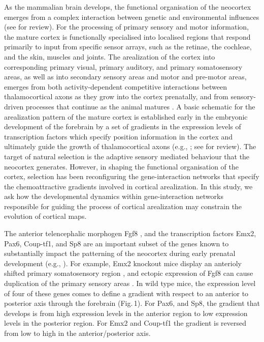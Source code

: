 \documentclass[10pt,letterpaper]{article}
\begin{document}
As the mammalian brain develops, the functional organisation of the neocortex emerges from a complex interaction between genetic and environmental influences (see \cite{Krubitzer2018} for review). For the processing of primary sensory and motor information, the mature cortex is functionally specialised into localised regions that respond primarily to input from specific sensor arrays, such as the retinae, the cochleae, and the skin, muscles and joints. The arealization of the cortex into corresponding primary visual, primary auditory, and primary somatosensory areas, as well as into secondary sensory areas and motor and pre-motor areas, emerges from both activity-dependent competitive interactions between thalamocortical axons as they grow into the cortex prenatally, and from sensory-driven processes that continue as the animal matures \cite{REFS}. A basic schematic for the arealization pattern of the mature cortex is established early in the embryonic development of the forebrain by a set of gradients in the expression levels of transcription factors which specify position information in the cortex and ultimately guide the growth of thalamocortical axons (e.g., \cite{Sur2005,Ypsilanti2016}; see \cite{Greig2013,Anton2018} for review). The target of natural selection is the adaptive sensory mediated behaviour that the neocortex generates. However, in shaping the functional organisation of the cortex, selection has been reconfiguring the gene-interaction networks that specify the chemoattractive gradients involved in cortical arealization. In this study, we ask how the developmental dynamics within gene-interaction networks responsible for guiding the process of cortical arealization may constrain the evolution of cortical maps. %

The anterior telencephalic morphogen Fgf8 \cite{Shimogori2005}, and the transcription factors Emx2, Pax6, Coup-tf1, and Sp8 are an important subset of the genes known to substantially impact the patterning of the neocortex during early prenatal development (e.g., \cite{Hamasaki2004,Manuel2007,Borello2014,Armentano2007,Greig2013}). For example, Emx2 knockout mice display an anterioly shifted primary somatosensory region \cite{Bishop2000,Bishop2002}, and ectopic expression of Fgf8 can cause duplication of the primary sensory areas \cite{Assimacopoulos2012}. In wild type mice, the expression level of four of these genes comes to define a gradient with respect to an anterior to posterior axis through the forebrain (Fig.\,1). For Pax6, and Sp8, the gradient that develops is from high expression levels in the anterior region to low expression levels in the posterior region. For Emx2 and Coup-tf1 the gradient is reversed from low to high in the anterior/posterior axis. 
\end{document}

